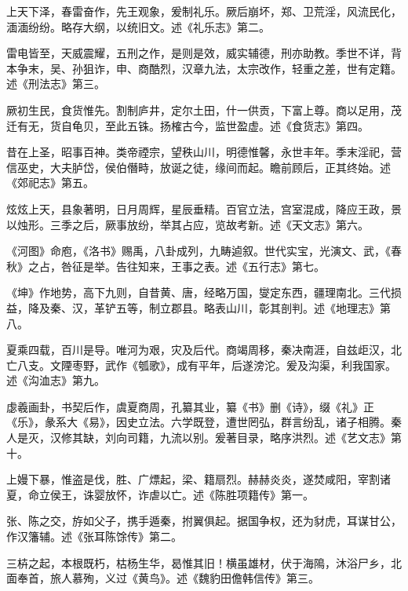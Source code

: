 \documentclass[12pt,UTF8]{ctexbook}
\begin{document}
上天下泽，春雷奋作，先王观象，爰制礼乐。厥后崩坏，郑、卫荒淫，风流民化，湎湎纷纷。略存大纲，以统旧文。述《礼乐志》第二。



雷电皆至，天威震耀，五刑之作，是则是效，威实辅德，刑亦助教。季世不详，背本争末，吴、孙狙诈，申、商酷烈，汉章九法，太宗改作，轻重之差，世有定籍。述《刑法志》第三。



厥初生民，食货惟先。割制庐井，定尔土田，什一供贡，下富上尊。商以足用，茂迁有无，货自龟贝，至此五铢。扬榷古今，监世盈虚。述《食货志》第四。



昔在上圣，昭事百神。类帝禋宗，望秩山川，明德惟馨，永世丰年。季末淫祀，营信巫史，大夫胪岱，侯伯僭畤，放诞之徒，缘间而起。瞻前顾后，正其终始。述《郊祀志》第五。



炫炫上天，县象著明，日月周辉，星辰垂精。百官立法，宫室混成，降应王政，景以烛形。三季之后，厥事放纷，举其占应，览故考新。述《天文志》第六。



《河图》命庖，《洛书》赐禹，八卦成列，九畴逌叙。世代实宝，光演文、武，《春秋》之占，咎征是举。告往知来，王事之表。述《五行志》第七。



《坤》作地势，高下九则，自昔黄、唐，经略万国，燮定东西，疆理南北。三代损益，降及秦、汉，革铲五等，制立郡县。略表山川，彰其剖判。述《地理志》第八。



夏乘四载，百川是导。唯河为艰，灾及后代。商竭周移，秦决南涯，自兹歫汉，北亡八支。文陻枣野，武作《瓠歌》，成有平年，后遂滂沱。爰及沟渠，利我国家。述《沟洫志》第九。



虙羲画卦，书契后作，虞夏商周，孔纂其业，纂《书》删《诗》，缀《礼》正《乐》，彖系大《易》，因史立法。六学既登，遭世罔弘，群言纷乱，诸子相腾。秦人是灭，汉修其缺，刘向司籍，九流以别。爰著目录，略序洪烈。述《艺文志》第十。



上嫚下暴，惟盗是伐，胜、广熛起，梁、籍扇烈。赫赫炎炎，遂焚咸阳，宰割诸夏，命立侯王，诛婴放怀，诈虐以亡。述《陈胜项籍传》第一。



张、陈之交，斿如父子，携手遁秦，拊翼俱起。据国争权，还为豺虎，耳谋甘公，作汉籓辅。述《张耳陈馀传》第二。



三枿之起，本根既朽，枯杨生华，曷惟其旧！横虽雄材，伏于海隝，沐浴尸乡，北面奉首，旅人慕殉，义过《黄鸟》。述《魏豹田儋韩信传》第三。
\end{document}
